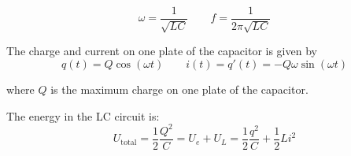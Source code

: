 \begin{theorem}
  \[
    \omega = \frac{1}{\sqrt{LC}} \qquad f = \frac{1}{2\pi \sqrt{LC}}
  \]

  The charge and current on one plate of the capacitor is given by
  \[
    q(t) = Q \cos(\omega t) \qquad i(t) = q'(t) = -Q \omega \sin(\omega t)
  \]

  where $Q$ is the maximum charge on one plate of the capacitor.

  The energy in the LC circuit is:
  \[
    U_{\text{total}} = \frac{1}{2} \frac{Q^2}{C} = U_e + U_L = \frac{1}{2} \frac{q^2}{C} + \frac{1}{2} Li^2
  \]
\end{theorem}
